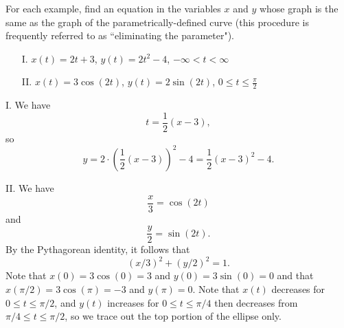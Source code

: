 \documentclass[noauthor,handout]{ximera}
\begin{document}
\begin{problem}
For each example, find an equation in the variables $x$ and $y$ whose graph is the same as the graph of the parametrically-defined curve (this procedure is frequently referred to as ``eliminating the parameter").

\begin{itemize}
\item[I.] $x(t) = 2t+3$, $y(t)=2t^2-4$, $-\infty < t < \infty$  
\item[II.] $x(t) = 3 \cos (2t)$, $y(t) = 2 \sin(2t)$, $0 \leq t \leq \frac{\pi}{2}$
\end{itemize}
\begin{freeResponse}
I. We have 
$$
t = \frac{1}{2}(x-3),
$$
so 
$$
y = 2 \cdot \left(\frac{1}{2}(x-3)\right)^2 - 4 = \frac{1}{2}(x-3)^2 - 4.
$$

II. We have
$$
\frac{x}{3} = \cos(2t)
$$
and 
$$
\frac{y}{2} = \sin(2t).
$$
By the Pythagorean identity, it follows that
$$
(x/3)^2 + (y/2)^2 = 1.
$$
Note that $x(0) = 3\cos(0)=3$ and $y(0) = 3 \sin(0) =0$ and that $x(\pi/2) = 3\cos(\pi)=-3$ and $y(\pi) = 0$.  Note that $x(t)$ decreases for $0 \leq t \leq \pi/2$, and $y(t)$ increases for $0 \leq t \leq \pi/4$ then decreases from $\pi/4 \leq t \leq \pi/2$, so we trace out the top portion of the ellipse only.

\end{freeResponse}
\end{problem}
\end{document}
